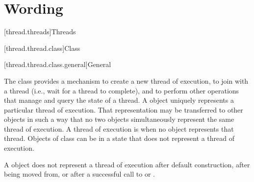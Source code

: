 \documentclass{wg21}
\begin{document}
\section{Wording}

[thread.threads]{Threads}

%
%
%
%
%
%
%
%
[thread.thread.class]{Class }

[thread.thread.class.general]{General}

\pnum
The class  provides a mechanism to create a new thread of execution, to join with
a thread (i.e., wait for a thread to complete), and to perform other operations that manage and
query the state of a thread. A  object uniquely represents a particular thread of
execution. That representation may be transferred to other  objects in such a way
that no two  objects simultaneously represent the same thread of execution. A
thread of execution is  when no  object represents that thread.
Objects of class  can be in a state that does not represent a thread of
execution.
\begin{note}
    A  object does not represent a thread of execution after
    default construction, after being moved from, or after a successful call to  or
    .
\end{note}
\end{document}

